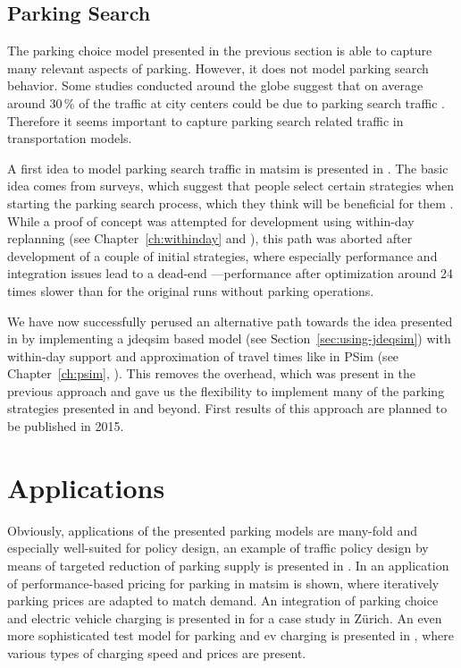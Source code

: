 \subsection{Parking Search}
The parking choice model presented in the previous section is able to capture many relevant aspects of parking. However, it does not model parking search behavior. Some studies conducted around the globe suggest that on average around 30\,\% of the traffic at city centers could be due to parking search traffic \citet[][]{Shoup_RSUE_2004}. Therefore it seems important to capture parking search related traffic in transportation models.

A first idea to model parking search traffic in \gls{matsim} is presented in \citet[][]{Waraich_unpub_IATBR_2012}. The basic idea comes from surveys, which suggest that people select certain strategies when starting the parking search process, which they think will be beneficial for them \citet[][]{AxhausenPolak_1989}. While a proof of concept was attempted for development using within-day replanning (see Chapter~\ref{ch:withinday} and \citep[][]{DoblerEtAl_TRR_2012}), this path was aborted after development of a couple of initial strategies, where especially performance and integration issues lead to a dead-end \citet[][]{WaraichEtAl_unpub_TRB_2013}---performance after optimization around 24\,times slower than for the original runs without parking operations. 

We have now successfully perused an alternative path towards the idea presented in \citet[][]{Waraich_unpub_IATBR_2012} by implementing a \gls{jdeqsim} based model (see Section~\ref{sec:using-jdeqsim}) with within-day support and approximation of travel times like in PSim (see Chapter~\ref{ch:psim}, \citet[][]{FourieEtAl_TRR_2013}). This removes the overhead, which was present in the previous approach and gave us the flexibility to implement many of the parking strategies presented in \citet[][]{AxhausenPolak_1989} and beyond. First results of this approach are planned to be published in 2015.

\section{Applications}
Obviously, applications of the presented parking models are many-fold and especially well-suited for policy design, \eg an example of traffic policy design by means of targeted reduction of parking supply is presented in \citet[][]{WaraichAxhausen_TRR_2012}. In \citet[][]{WaraichEtAl_unpub_TRB_2013} an application of performance-based pricing for parking in \gls{matsim} is shown, where iteratively parking prices are adapted to match demand. An integration of parking choice and electric vehicle charging is presented in \citet[][]{WaraichEtAl_JanssensEtAl_2014} for a case study in Zürich. An even more sophisticated test model for parking and \gls{ev} charging is presented in \citet[][]{BemetzHohenfellner_BSCThesis_2014}, where various types of charging speed and prices are present.

